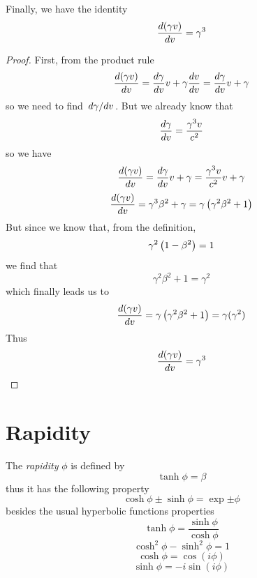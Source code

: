 \documentclass[oneside, 10pt, notitlepage]{book}
\begin{document}
Finally, we have the identity 
\begin{equation}\dv{(\gamma v)}{v} = \gamma^3\end{equation}
\begin{proof}
	First, from the product rule 
	\begin{equation}\dv{(\gamma v)}{v} = \dv{\gamma}{v} v + \gamma \dv{v}{v} = \dv{\gamma}{v} v + \gamma \end{equation}
	so we need to find \(\dv*{\gamma}{v}\). But we already know that
	\begin{equation}\dv{\gamma}{v} = \frac{\gamma^3 v}{c^2}\end{equation}
	so we have 
	\begin{equation}\dv{(\gamma v)}{v} = \dv{\gamma}{v} v + \gamma = \frac{\gamma^3 v}{c^2} v + \gamma\end{equation}
	\begin{equation}\dv{(\gamma v)}{v} = \gamma^3 \beta^2 + \gamma = \gamma \left(\gamma^2 \beta^2 + 1\right)\end{equation}
	But since we know that, from the definition,
	\begin{equation}\gamma^2 \left(1-\beta^2\right) = 1\end{equation}
	we find that
	\begin{equation}\gamma^2 \beta^2 + 1 = \gamma^2\end{equation}
	which finally leads us to 
	\begin{equation}\dv{(\gamma v)}{v} = \gamma \left(\gamma^2 \beta^2 + 1\right) = \gamma (\gamma^2)\end{equation}
	Thus
	\begin{equation}\dv{(\gamma v)}{v} = \gamma^3\end{equation}

\end{proof}

\section{Rapidity}

The \emph{rapidity} \(\phi\) is defined by
\begin{equation}\tanh \phi = \beta \end{equation}
thus it has the following property
\begin{equation}\cosh \phi \pm \sinh \phi = \exp{\pm \phi}\end{equation}
besides the usual hyperbolic functions properties
\begin{equation}\tanh \phi = \frac{\sinh \phi}{\cosh \phi}\end{equation}
\begin{equation}\cosh^2 \phi - \sinh^2 \phi = 1\end{equation}
\begin{equation}\cosh \phi = \cos (i\phi)\end{equation}
\begin{equation}\sinh \phi = -i \sin (i \phi)\end{equation}
  
\end{document}
